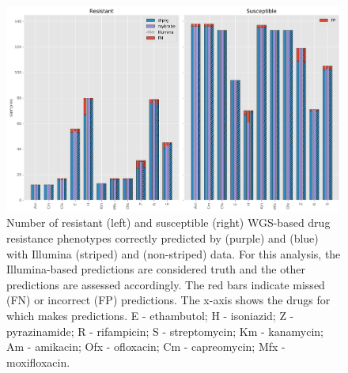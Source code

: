 \begin{figure}
\begin{center}
\includegraphics[width=0.90\columnwidth]{Chapter3/Figs/illumina_concordance.png}
\caption{{Number of resistant (left) and susceptible (right) WGS-based drug resistance phenotypes correctly predicted by \mykrobe{} \ont{} (purple) and \drprg{} (blue) with Illumina (striped) and \ont{} (non-striped) data. For this analysis, the Illumina-based \mykrobe{} predictions are considered truth and the other predictions are assessed accordingly. The red bars indicate missed (FN) or incorrect (FP) predictions. The x-axis shows the drugs for which \mykrobe{} makes predictions. E - ethambutol; H - isoniazid; Z - pyrazinamide; R - rifampicin; S - streptomycin; Km - kanamycin; Am - amikacin; Ofx - ofloxacin; Cm - capreomycin; Mfx - moxifloxacin.
{\label{fig:geno-concordance}}
}}
\end{center}
\end{figure}

